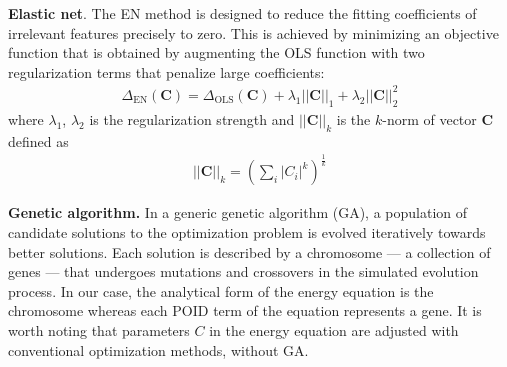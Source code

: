 \documentclass[aip,jcp,reprint,amsmath,amssymb,nature]{revtex4-1}
\begin{document}
\textbf{Elastic net}. The EN method is designed to reduce the fitting coefficients of irrelevant features precisely to zero. This is achieved by minimizing an objective function that is obtained by augmenting the OLS function with two regularization terms that penalize large coefficients: 
%
\begin{eqnarray}
\Delta_{\text{EN}}(\mathbf{C}) = \Delta_{\text{OLS}}(\mathbf{C}) + \lambda_1 \vert\vert \mathbf{C} \vert\vert_1 + \lambda_2 \vert\vert \mathbf{C} \vert\vert_2^2  \label{eq:OF-EN}
\end{eqnarray}
%
where $\lambda_1$, $\lambda_2$ is the regularization strength and $\vert\vert \mathbf{C} \vert\vert_k$ is the $k$-norm of vector $\mathbf{C}$ defined as
%
\begin{eqnarray}
\vert\vert \mathbf{C} \vert\vert_k = \left( \sum_{i} \vert C_i \vert^k \right)^{\frac{1}{k}}  \label{eq:k-nrom}
\end{eqnarray}
%


\textbf{Genetic algorithm.} In a generic genetic algorithm (GA), a population of candidate solutions to the optimization problem is evolved iteratively towards better solutions. Each solution is described by a chromosome --- a collection of genes --- that undergoes mutations and crossovers in the simulated evolution process. In our case, the analytical form of the energy equation is the chromosome whereas each POID term of the equation represents a gene. It is worth noting that parameters $C$ in the energy equation are adjusted with conventional optimization methods, without GA.
\end{document}
